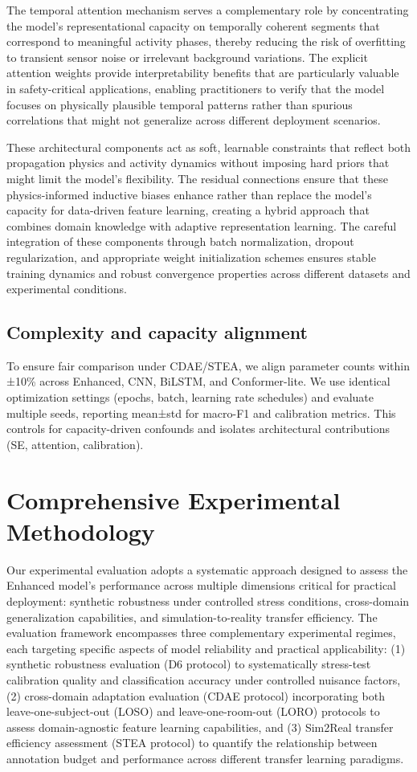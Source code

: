 \documentclass[journal]{IEEEtran}
\begin{document}
The temporal attention mechanism serves a complementary role by concentrating the model's representational capacity on temporally coherent segments that correspond to meaningful activity phases, thereby reducing the risk of overfitting to transient sensor noise or irrelevant background variations. The explicit attention weights provide interpretability benefits that are particularly valuable in safety-critical applications, enabling practitioners to verify that the model focuses on physically plausible temporal patterns rather than spurious correlations that might not generalize across different deployment scenarios.

These architectural components act as soft, learnable constraints that reflect both propagation physics and activity dynamics without imposing hard priors that might limit the model's flexibility. The residual connections ensure that these physics-informed inductive biases enhance rather than replace the model's capacity for data-driven feature learning, creating a hybrid approach that combines domain knowledge with adaptive representation learning. The careful integration of these components through batch normalization, dropout regularization, and appropriate weight initialization schemes ensures stable training dynamics and robust convergence properties across different datasets and experimental conditions.

\subsection{Complexity and capacity alignment}
To ensure fair comparison under CDAE/STEA, we align parameter counts within ±10\% across Enhanced, CNN, BiLSTM, and Conformer-lite. We use identical optimization settings (epochs, batch, learning rate schedules) and evaluate multiple seeds, reporting mean±std for macro-F1 and calibration metrics. This controls for capacity-driven confounds and isolates architectural contributions (SE, attention, calibration).

\section{Comprehensive Experimental Methodology}

Our experimental evaluation adopts a systematic approach designed to assess the Enhanced model's performance across multiple dimensions critical for practical deployment: synthetic robustness under controlled stress conditions, cross-domain generalization capabilities, and simulation-to-reality transfer efficiency. The evaluation framework encompasses three complementary experimental regimes, each targeting specific aspects of model reliability and practical applicability: (1) synthetic robustness evaluation (D6 protocol) to systematically stress-test calibration quality and classification accuracy under controlled nuisance factors, (2) cross-domain adaptation evaluation (CDAE protocol) incorporating both leave-one-subject-out (LOSO) and leave-one-room-out (LORO) protocols to assess domain-agnostic feature learning capabilities, and (3) Sim2Real transfer efficiency assessment (STEA protocol) to quantify the relationship between annotation budget and performance across different transfer learning paradigms.
\end{document}

